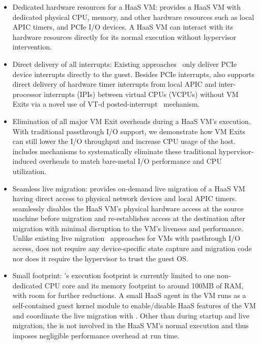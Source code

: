 \begin{itemize} 
\parskip 0mm
\itemsep 0mm

\item Dedicated hardware resources for a HaaS VM: \na provides a HaaS VM with 
dedicated physical CPU, memory, and other hardware resources such as 
local APIC timers, and PCIe I/O devices. A HaaS VM can interact with its hardware resources
directly for its normal execution without hypervisor intervention.


\item Direct delivery of all interrupts: 
Existing approaches~\cite{amit:2015,tu:2015}
only deliver PCIe device interrupts directly to the guest. 
Besides PCIe interrupts, \na also supports 
direct delivery of hardware timer interrupts from local APIC  and 
inter-processor interrupts (IPIs) between 
virtual CPUs (VCPUs) without VM Exits via a novel use of VT-d 
posted-interrupt~\cite{postedinterrupt} mechanism.

\item Elimination of all major VM Exit overheads  during a HaaS VM's execution. 
With traditional passthrough I/O support, we demonstrate how VM Exits can still
lower the I/O throughput and increase CPU usage of the host.
\na includes mechanisms to systematically eliminate
these traditional hypervisor-induced overheads to match bare-metal I/O performance and CPU utilization.

\item Seamless live migration: 
\na provides on-demand live migration of a HaaS VM having direct access to 
physical network devices and local APIC timers. 
\na seamlessly disables the HaaS VM's physical hardware access at the 
source machine before migration and 
re-establishes access at the destination after migration
with minimal disruption to the VM's liveness and performance.
Unlike existing live migration~\cite{vfio-live-migration,blmvisor-journal,ondemand} approaches for VMs with pasthrough 
I/O access, \na does not require any device-specific state capture and migration code 
nor does it require the hypervisor to trust the guest OS. 

\item Small footprint: \sna's execution footprint is currently limited to one non-dedicated 
CPU core and its memory footprint to around 100MB of RAM, with room for further reductions.
A small HaaS agent in the VM runs as a self-contained guest kernel module
to enable/disable HaaS features of the VM and coordinate the live migration with \sna.
Other than during startup and live migration, the \na is not involved in the
HaaS VM's normal execution and thus imposes negligible performance overhead at run time.  

\end{itemize}

